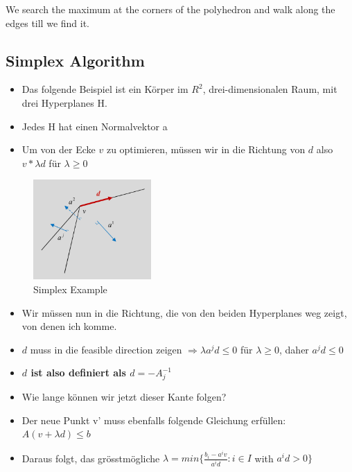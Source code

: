 We search the maximum at the corners of the polyhedron and walk along the edges till we find it. 

\subsection{Simplex Algorithm}

\begin{itemize}
    \item Das folgende Beispiel ist ein Körper im $R^2$, drei-dimensionalen Raum, mit drei Hyperplanes H.
    \item Jedes H hat einen Normalvektor a
    \item Um von der Ecke $v$ zu optimieren, müssen wir in die Richtung von $d$ also $v * \lambda d$ für $\lambda \geq 0$
\end{itemize}

\begin{figure}[H]
\centering
\includegraphics[width=0.4\textwidth]{figures/simplex_example.png}
\caption{Simplex Example}
\end{figure}

\begin{itemize}
    \item Wir müssen nun in die Richtung, die von den beiden Hyperplanes weg zeigt, von denen ich komme. 
    \item $d$ muss in die feasible direction zeigen $\Rightarrow \lambda a^j d \leq 0$ für $\lambda \geq 0$, daher $a^jd \leq 0$
    \item \textbf{$d$ ist also definiert als $d = -A_{j}^{-1}$}
    \item Wie lange können wir jetzt dieser Kante folgen?
    \item Der neue Punkt v' muss ebenfalls folgende Gleichung erfüllen: $A(v + \lambda d) \leq b$
    \item Daraus folgt, das grösstmögliche $\lambda = min\{\frac{b_i - a^iv}{a^id} : i \in I$ with $a^id > 0\}$
\end{itemize}

